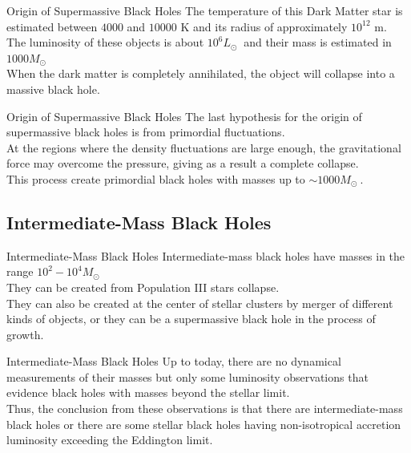 \documentclass{beamer}
\begin{document}
\begin{frame}{Origin of Supermassive Black Holes}
	\onslide<1-> The temperature of this Dark Matter star is estimated between $4000$ and $10000$ \si{K} and its radius of approximately $10^{12}$ \si{m}.\\
	\pause
	\bigskip
	\onslide<2-> The luminosity of these objects is about $10^6 L_\odot\ $ and their mass is estimated in $1000 M_\odot\ $\\ 
	\pause
	\bigskip
	\onslide<3-> When the dark matter is completely annihilated, the object will collapse into a massive black hole.
\end{frame}

\begin{frame}{Origin of Supermassive Black Holes}
	\onslide<1-> The last hypothesis for the origin of supermassive black holes is from primordial fluctuations.\\
	\pause
	\bigskip
	\onslide<2-> At the regions where the density fluctuations are large enough, the gravitational force may overcome the pressure, giving as a result a complete collapse.\\ 
	\pause
	\bigskip
	\onslide<3-> This process create primordial black holes with masses up to $\sim 1000 M_\odot\ $. \\
\end{frame}


\subsection{Intermediate-Mass Black Holes}
\begin{frame}{Intermediate-Mass Black Holes}
	\onslide<1-> 
    Intermediate-mass black holes have masses in the range $10^2 - 10^4 M_\odot\ $ \\
	\pause    
    \bigskip
    They can be created from Population III stars collapse.\\
    \pause    
    \bigskip
    They can also be created at the center of stellar clusters by merger of different kinds of objects, or they can be a supermassive black hole in the process of growth.\\
\end{frame}

\begin{frame}{Intermediate-Mass Black Holes}
	\onslide<1-> 
     Up to today, there are no dynamical measurements of their masses but only some luminosity observations that evidence black holes with masses beyond the stellar limit.\\
    \pause    
    \bigskip
    Thus, the conclusion from these observations is that there are intermediate-mass black holes or there are some stellar black holes having non-isotropical accretion luminosity exceeding the Eddington limit. 
\end{frame}
\end{document}
